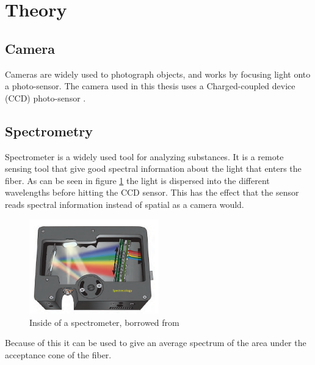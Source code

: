 \section{Theory}

\subsection{Camera}
Cameras are widely used to photograph objects, and works by focusing light onto a photo-sensor. The camera used in this thesis uses a Charged-coupled device (CCD) photo-sensor \cite{JYIVolumeThree}.

\subsection{Spectrometry}
Spectrometer is a widely used tool for analyzing substances. It is a remote sensing tool that give good spectral information about the light that enters the fiber. As can be seen in figure \ref{fig:spectrometer_inside} the light is dispersed into the different wavelengths before hitting the CCD sensor. This has the effect that the sensor reads spectral information instead of spatial as a camera would. 

\begin{figure}[h]
    \centering
    \includegraphics[width=0.5\textwidth]{figures/Mini-spectrometer-open-bench.png}
    \caption{Inside of a spectrometer, borrowed from \cite{KAI0340640480}}
    \label{fig:spectrometer_inside}
\end{figure}

Because of this it can be used to give an average spectrum of the area under the acceptance cone of the fiber. 

